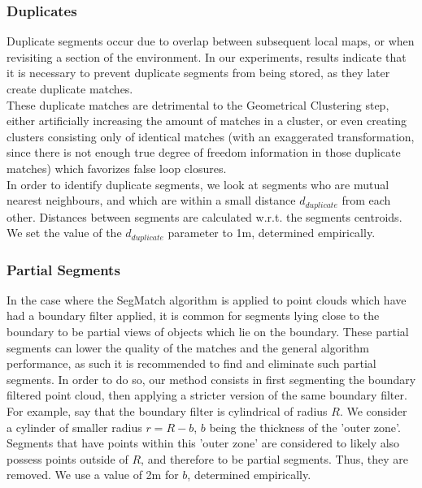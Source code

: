 \subsubsection{Duplicates}
\label{subsub:sec:duplicates}

Duplicate segments occur due to overlap between subsequent local maps, or when revisiting a section of the environment.
In our experiments, results indicate that it is necessary to prevent duplicate segments from being stored, as they later create duplicate matches.\\ 

These duplicate matches are detrimental to the Geometrical Clustering step, either artificially increasing the amount of matches in a cluster, or even creating clusters consisting only of identical matches (with an exaggerated transformation, since there is not enough true degree of freedom information in those duplicate matches) which favorizes false loop closures.\\

In order to identify duplicate segments, we look at segments who are mutual nearest neighbours, and which are within a small distance $d_{duplicate}$ from each other. Distances between segments are calculated w.r.t. the segments centroids. We set the value of the $d_{duplicate}$ parameter to 1m, determined empirically.\\

\subsubsection{Partial Segments}
\label{subsubsec:partial}

In the case where the SegMatch algorithm is applied to point clouds which have had a boundary filter applied, it is common for segments lying close to the boundary to be partial views of objects which lie on the boundary. 
These partial segments can lower the quality of the matches and the general algorithm performance, as such it is recommended to find and eliminate such partial segments. 
In order to do so, our method consists in first segmenting the boundary filtered point cloud, then applying a stricter version of the same boundary filter.\\

For example, say that the boundary filter is cylindrical of radius $R$. We consider a cylinder of smaller radius $r = R-b$, $b$ being the thickness of the 'outer zone'. Segments that have points within this 'outer zone' are considered to likely also possess points outside of $R$, and therefore to be partial segments. Thus, they are removed. We use a value of 2m for $b$, determined empirically.\\


